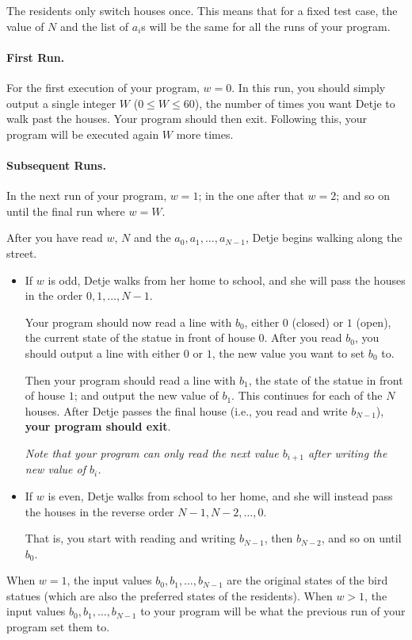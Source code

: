 The residents only switch houses once.
This means that for a fixed test case, the value of $N$ and the list of $a_i$s will be the same for all the runs of your program.

\paragraph{First Run.}
For the first execution of your program, $w = 0$.
In this run, you should simply output a single integer $W$ ($0 \le W \le 60$), the number of times you want Detje to walk past the houses.
Your program should then exit. Following this, your program will be executed again $W$ more times.

\paragraph{Subsequent Runs.}
In the next run of your program, $w = 1$; in the one after that $w = 2$; and so on until the final run where $w = W$.

After you have read $w$, $N$ and the $a_0, a_1, \ldots, a_{N-1}$, Detje begins walking along the street.

\begin{itemize}
\item If $w$ is odd, Detje walks from her home to school, and she will pass the houses in the order $0, 1, \ldots, N-1$.

  Your program should now read a line with $b_0$, either $0$ (closed) or $1$ (open), the current state of the statue in front of house $0$.
After you read $b_0$, you should output a line with either $0$ or $1$, the new value you want to set $b_0$ to.

  Then your program should read a line with $b_1$, the state of the statue in front of house $1$; and output the new value of $b_1$.
This continues for each of the $N$ houses. After Detje passes the final house (i.e., you read and write $b_{N-1}$), \textbf{your program should exit}.

  \textit{Note that your program can only read the next value $b_{i+1}$ after writing the new value of $b_i$.}
\item If $w$ is even, Detje walks from school to her home, and she will instead pass the houses in the reverse order $N-1, N-2, \ldots, 0$.

That is, you start with reading and writing $b_{N-1}$, then $b_{N-2}$, and so on until $b_0$.

\end{itemize}
When $w = 1$, the input values $b_0, b_1, \ldots, b_{N-1}$ are the original states of the bird statues (which are also the preferred states of the residents).
When $w > 1$, the input values $b_0, b_1, \ldots, b_{N-1}$ to your program will be what the previous run of your program set them to.

